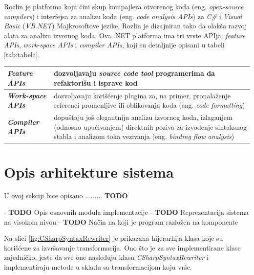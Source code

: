 \documentclass[a4paper]{article}
\begin{document}
{Rozlin je platforma koju čini skup kompajlera otvorenog koda (eng. \textit{open-source compilers}) i interfejsa za analizu koda (eng. \textit{code analysis APIs}) za \textit{C\#} i \textit{Visual Basic} (\textit{VB.NET}) Majkrosoftove jezike. Rozlin je dizajniran tako da olakša razvoj alata za analizu izvornog koda. Ova .NET platforma ima tri vrste APIja: \textit{feature APIs}, \textit{work-space APIs} i \textit{compiler APIs}, koji su detaljnije opisani u tabeli \ref{tab:tabela}.

\begin{center}
\label{tab:tabela} %
\begin{tabular}{ | m{3cm} | m{6cm} | } 
 \hline
  \textbf{\textit{Feature APIs}} & dozvoljavaju \textit{source code tool} programerima da refaktorišu i isprave kod  \\ 
  \hline
  \textbf{\textit{Work-space APIs}} & dozvoljavaju korišćenje plugina za, na primer, pronalaženje referenci promenljive ili oblikovanja koda (eng. \textit{code formatting})  \\ 
  \hline
  \textbf{\textit{Compiler APIs}} & dopuštaju još elegantniju analizu izvornog koda, izlaganjem (odnosno upućivanjem) direktnih poziva za izvođenje sintaksnog stabla i analizom toka vezivanja (eng. \textit{binding flow analysis})  \\ 
  \hline
\end{tabular}
\end{center}



\section{Opis arhitekture sistema}
\label{sec:opis_arhitekture_sistema}

U ovoj sekciji bice opisano ......... \textbf{TODO}

\hfill

- \textbf{TODO} Opis osnovnih modula implementacije
- \textbf{TODO} Reprezentacija sistema na visokom nivou
- \textbf{TODO} Način na koji je program razložen na komponente

\hfill

Na slici \ref{fig:CSharpSyntaxRewriter} je prikazana hijerarhija klasa koje su korišćene za izvršavanje transformacija. Ono što je za sve implementirane klase zajedničko, jeste da sve one nasleđuju klasu \textit{CSharpSyntaxRewriter} i implementiraju metode u skladu sa transformacijom koju vrše.

}
\end{document}

